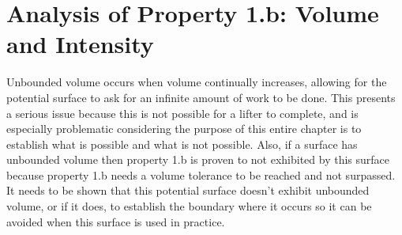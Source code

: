 \section{Analysis of Property 1.b: Volume and Intensity}
\label{sec:PotentialSurfaceAnalysisOfProperty1b}

Unbounded volume occurs when volume continually increases, allowing for the potential surface to ask for an infinite amount of work to be done. This presents a serious issue because this is not possible for a lifter to complete, and is especially problematic considering the purpose of this entire chapter is to establish what is possible and what is not possible. Also, if a surface has unbounded volume then property 1.b is proven to not exhibited by this surface because property 1.b needs a volume tolerance to be reached and not surpassed. It needs to be shown that this potential surface doesn't exhibit unbounded volume, or if it does, to establish the boundary where it occurs so it can be avoided when this surface is used in practice.
%
%

